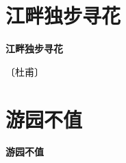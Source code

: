 \documentclass[12pt,UTF-8,openany,fontset=none]{ctexbook}
\begin{document}
\vspace{8pt}
\clearpage


\section{江畔独步寻花}



\begin{center}
    {\bfseries 江畔独步寻花}
\end{center}

\begin{center}
    \vspace{10pt}
    
    \begin{large}
        
        〔杜甫〕
        
    \end{large}
    
    \vspace{8pt}
    
    \begin{huge}
        
        \phantom{。}

        \phantom{。}
        
        \phantom{。}

        \phantom{。}
        
    \end{huge}
    
\end{center}

\vspace{8pt}
\clearpage


\section{游园不值}



\begin{center}
    {\bfseries 游园不值}
\end{center}
\end{document}
